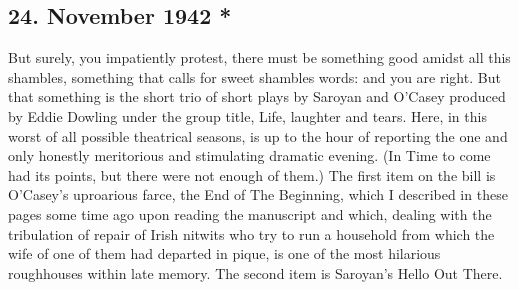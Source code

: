 \subsection{24. November 1942 *}

But surely, you impatiently protest, there must be something good amidst all this shambles, something that calls for sweet shambles words: and you are right.
But that something is the short trio of short plays by Saroyan and O'Casey produced by Eddie Dowling under the group title, Life, laughter and tears.
Here, in this worst of all possible theatrical seasons, is up to the hour of reporting the one and only honestly meritorious and stimulating dramatic evening.
(In Time to come had its points, but there were not enough of them.)
The first item on the bill is O'Casey's uproarious farce, the End of The Beginning, which I described in these pages some time ago upon reading the manuscript and which, dealing with the tribulation of repair of Irish nitwits who try to run a household from which the wife of one of them had departed in pique, is one of the most hilarious roughhouses within late memory.
The second item is Saroyan's Hello Out There.

\clearpage
